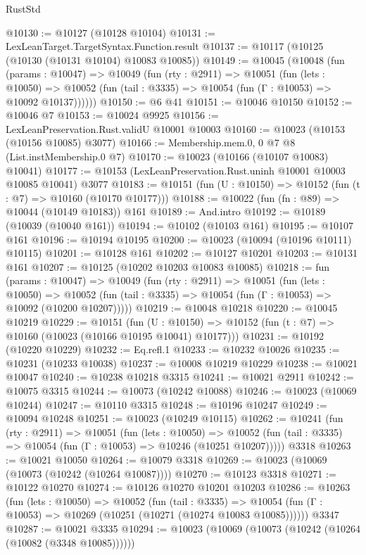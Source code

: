 \begin{lexlean}{RustStd}
\begin{coremodule}
@10130 := @10127 (@10128 @10104)
@10131 := LexLeanTarget.TargetSyntax.Function.result
@10137 := @10117 (@10125 (@10130 (@10131 @10104) @10083 @10085))
@10149 := @10045
    (@10048
      (fun (params : @10047) =>
      @10049
        (fun (rty : @2911) =>
        @10051
          (fun (lets : @10050) =>
          @10052 (fun (tail : @3335) => @10054 (fun (Γ : @10053) => @10092 @10137))))))
@10150 := @6 @41
@10151 := @10046 @10150
@10152 := @10046 @7
@10153 := @10024 @9925
@10156 := LexLeanPreservation.Rust.validU @10001 @10003
@10160 := @10023 (@10153 (@10156 @10085) @3077)
@10166 := Membership.mem.{0, 0} @7 @8 (List.instMembership.{0} @7)
@10170 := @10023 (@10166 (@10107 @10083) @10041)
@10177 := @10153 (LexLeanPreservation.Rust.uninh @10001 @10003 @10085 @10041) @3077
@10183 := @10151 (fun (U : @10150) => @10152 (fun (t : @7) => @10160 (@10170 @10177)))
@10188 := @10022 (fun (fn : @89) => @10044 (@10149 @10183)) @161
@10189 := And.intro
@10192 := @10189 (@10039 (@10040 @161))
@10194 := @10102 (@10103 @161)
@10195 := @10107 @161
@10196 := @10194 @10195
@10200 := @10023 (@10094 (@10196 @10111) @10115)
@10201 := @10128 @161
@10202 := @10127 @10201
@10203 := @10131 @161
@10207 := @10125 (@10202 @10203 @10083 @10085)
@10218 := fun (params : @10047) =>
  @10049
    (fun (rty : @2911) =>
    @10051
      (fun (lets : @10050) =>
      @10052 (fun (tail : @3335) => @10054 (fun (Γ : @10053) => @10092 (@10200 @10207)))))
@10219 := @10048 @10218
@10220 := @10045 @10219
@10229 := @10151
    (fun (U : @10150) => @10152 (fun (t : @7) => @10160 (@10023 (@10166 @10195 @10041) @10177)))
@10231 := @10192 (@10220 @10229)
@10232 := Eq.refl.{1}
@10233 := @10232 @10026
@10235 := @10231 (@10233 @10038)
@10237 := @10008 @10219 @10229
@10238 := @10021 @10047
@10240 := @10238 @10218 @3315
@10241 := @10021 @2911
@10242 := @10075 @3315
@10244 := @10073 (@10242 @10088)
@10246 := @10023 (@10069 @10244)
@10247 := @10110 @3315
@10248 := @10196 @10247
@10249 := @10094 @10248
@10251 := @10023 (@10249 @10115)
@10262 := @10241
    (fun (rty : @2911) =>
    @10051
      (fun (lets : @10050) =>
      @10052 (fun (tail : @3335) => @10054 (fun (Γ : @10053) => @10246 (@10251 @10207)))))
    @3318
@10263 := @10021 @10050
@10264 := @10079 @3318
@10269 := @10023 (@10069 (@10073 (@10242 (@10264 @10087))))
@10270 := @10123 @3318
@10271 := @10122 @10270
@10274 := @10126 @10270 @10201 @10203
@10286 := @10263
    (fun (lets : @10050) =>
    @10052
      (fun (tail : @3335) =>
      @10054 (fun (Γ : @10053) => @10269 (@10251 (@10271 (@10274 @10083 @10085))))))
    @3347
@10287 := @10021 @3335
@10294 := @10023 (@10069 (@10073 (@10242 (@10264 (@10082 (@3348 @10085))))))

\end{coremodule}
\end{lexlean}
